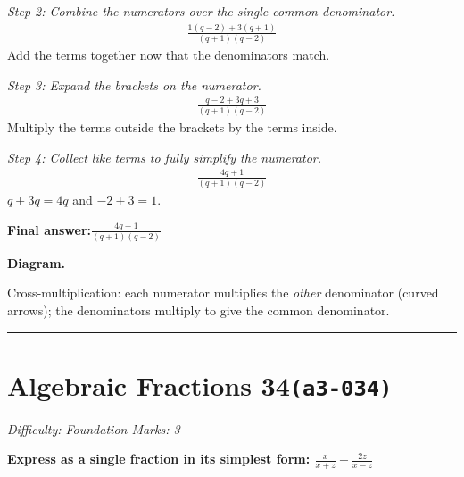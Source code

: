 \documentclass[11pt]{article}
\newcommand{\question}[1]{\par\medskip\noindent\textbf{#1}\par}
\begin{document}
\textit{Step 2: Combine the numerators over the single common denominator.}
\[\begin{gathered}
\frac{1(q-2) + 3(q+1)}{(q+1)(q-2)}
\end{gathered}\]
Add the terms together now that the denominators match.

\textit{Step 3: Expand the brackets on the numerator.}
\[\begin{gathered}
\frac{q - 2 + 3q + 3}{(q+1)(q-2)}
\end{gathered}\]
Multiply the terms outside the brackets by the terms inside.

\textit{Step 4: Collect like terms to fully simplify the numerator.}
\[\begin{gathered}
\frac{4q + 1}{(q+1)(q-2)}
\end{gathered}\]
\( q + 3q = 4q \) and \( -2 + 3 = 1 \).

\begin{answerbox}
\textbf{Final answer:}\quad \(\displaystyle \frac{4q + 1}{(q+1)(q-2)}\)
\end{answerbox}
\textbf{Diagram.}

\begin{center}
\end{center}
\small Cross-multiplication: each numerator multiplies the \emph{other} denominator (curved arrows); the denominators multiply to give the common denominator.\normalsize

\medskip\hrule

\section*{Algebraic Fractions 34\quad\small\texttt{(a3-034)}}
\textit{Difficulty: Foundation \quad\textbar\quad Marks: 3}

\question{Express as a single fraction in its simplest form: \( \frac{x}{x+z} + \frac{2z}{x-z} \)}
\end{document}
